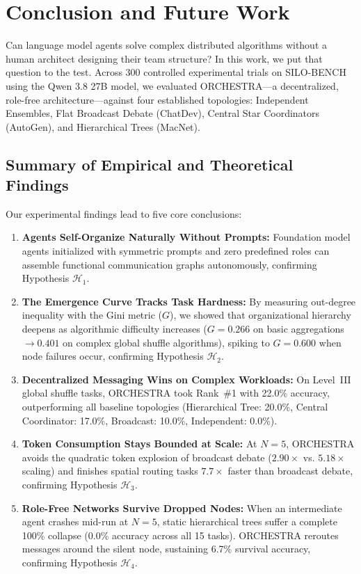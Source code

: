 \documentclass{ieeeaccess}
\begin{document}
\section{Conclusion and Future Work}
\label{sec:conclusion}

Can language model agents solve complex distributed algorithms without a human architect designing their team structure? In this work, we put that question to the test. Across 300 controlled experimental trials on SILO-BENCH using the Qwen 3.8 27B model, we evaluated ORCHESTRA---a decentralized, role-free architecture---against four established topologies: Independent Ensembles, Flat Broadcast Debate (ChatDev), Central Star Coordinators (AutoGen), and Hierarchical Trees (MacNet).

\subsection{Summary of Empirical and Theoretical Findings}
Our experimental findings lead to five core conclusions:
\begin{enumerate}
    \item \textbf{Agents Self-Organize Naturally Without Prompts:} Foundation model agents initialized with symmetric prompts and zero predefined roles can assemble functional communication graphs autonomously, confirming Hypothesis $\mathcal{H}_1$.
    \item \textbf{The Emergence Curve Tracks Task Hardness:} By measuring out-degree inequality with the Gini metric ($G$), we showed that organizational hierarchy deepens as algorithmic difficulty increases ($G = 0.266$ on basic aggregations $\to 0.401$ on complex global shuffle algorithms), spiking to $G = 0.600$ when node failures occur, confirming Hypothesis $\mathcal{H}_2$.
    \item \textbf{Decentralized Messaging Wins on Complex Workloads:} On Level~III global shuffle tasks, ORCHESTRA took Rank~\#1 with 22.0\% accuracy, outperforming all baseline topologies (Hierarchical Tree: 20.0\%, Central Coordinator: 17.0\%, Broadcast: 10.0\%, Independent: 0.0\%).
    \item \textbf{Token Consumption Stays Bounded at Scale:} At $N=5$, ORCHESTRA avoids the quadratic token explosion of broadcast debate ($2.90\times$ vs. $5.18\times$ scaling) and finishes spatial routing tasks $7.7\times$ faster than broadcast debate, confirming Hypothesis $\mathcal{H}_3$.
    \item \textbf{Role-Free Networks Survive Dropped Nodes:} When an intermediate agent crashes mid-run at $N=5$, static hierarchical trees suffer a complete 100\% collapse (0.0\% accuracy across all 15 tasks). ORCHESTRA reroutes messages around the silent node, sustaining 6.7\% survival accuracy, confirming Hypothesis $\mathcal{H}_4$.
\end{enumerate}
\end{document}
